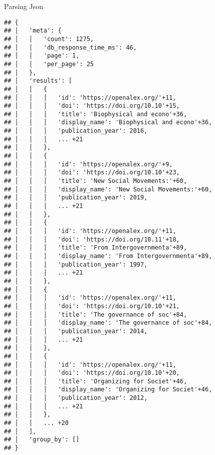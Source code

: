 \documentclass[
  10pt,
  ignorenonframetext,
  aspectratio=169]{beamer}
\begin{document}
\begin{frame}[fragile]{Parsing Json}
\begin{verbatim}
## {
## │   'meta': {
## │   │   'count': 1275,
## │   │   'db_response_time_ms': 46,
## │   │   'page': 1,
## │   │   'per_page': 25
## │   },
## │   'results': [
## │   │   {
## │   │   │   'id': 'https://openalex.org/'+11,
## │   │   │   'doi': 'https://doi.org/10.10'+15,
## │   │   │   'title': 'Biophysical and econo'+36,
## │   │   │   'display_name': 'Biophysical and econo'+36,
## │   │   │   'publication_year': 2016,
## │   │   │   ... +21
## │   │   },
## │   │   {
## │   │   │   'id': 'https://openalex.org/'+9,
## │   │   │   'doi': 'https://doi.org/10.10'+23,
## │   │   │   'title': 'New Social Movements:'+60,
## │   │   │   'display_name': 'New Social Movements:'+60,
## │   │   │   'publication_year': 2019,
## │   │   │   ... +21
## │   │   },
## │   │   {
## │   │   │   'id': 'https://openalex.org/'+11,
## │   │   │   'doi': 'https://doi.org/10.11'+18,
## │   │   │   'title': 'From Intergovernmenta'+89,
## │   │   │   'display_name': 'From Intergovernmenta'+89,
## │   │   │   'publication_year': 1997,
## │   │   │   ... +21
## │   │   },
## │   │   {
## │   │   │   'id': 'https://openalex.org/'+11,
## │   │   │   'doi': 'https://doi.org/10.10'+21,
## │   │   │   'title': 'The governance of soc'+84,
## │   │   │   'display_name': 'The governance of soc'+84,
## │   │   │   'publication_year': 2014,
## │   │   │   ... +21
## │   │   },
## │   │   {
## │   │   │   'id': 'https://openalex.org/'+11,
## │   │   │   'doi': 'https://doi.org/10.10'+20,
## │   │   │   'title': 'Organizing for Societ'+46,
## │   │   │   'display_name': 'Organizing for Societ'+46,
## │   │   │   'publication_year': 2012,
## │   │   │   ... +21
## │   │   },
## │   │   ... +20
## │   ],
## │   'group_by': []
## }
\end{verbatim}
\end{frame}
\end{document}
